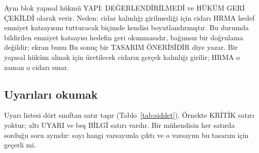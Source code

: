 \documentclass[11pt,a4paper]{article}
\newcommand{\ui}[1]{\textsf{#1}}
\begin{document}
Aynı blok yapısal hükmü \ui{YAPI: DEĞERLENDİRİLMEDİ} ve \ui{HÜKÜM GERİ ÇEKİLDİ}
olarak verir. Neden: cidar kalınlığı girilmediği için cidarı HRMA hedef
emniyet katsayısını tutturacak biçimde kendisi boyutlandırmıştır. Bu durumda
bildirilen emniyet katsayısı hedefin geri okunmasıdır, bağımsız bir doğrulama
değildir; ekran bunu \ui{Bu sonuç bir TASARIM ÖNERİSİDİR} diye yazar. Bir
yapısal hüküm almak için üretilecek cidarın gerçek kalınlığı girilir; HRMA o
zaman o cidarı sınar.

\subsection{Uyarıları okumak}

Uyarı listesi dört sınıftan satır taşır (Tablo~\ref{tab:siddet}). Örnekte
\ui{KRİTİK} satırı yoktur; altı \ui{UYARI} ve beş \ui{BİLGİ} satırı vardır.
Bir mühendisin her satırda sorduğu soru aynıdır: sayı hangi varsayımla
çıktı ve o varsayım bu tasarım için geçerli mi.
\end{document}
